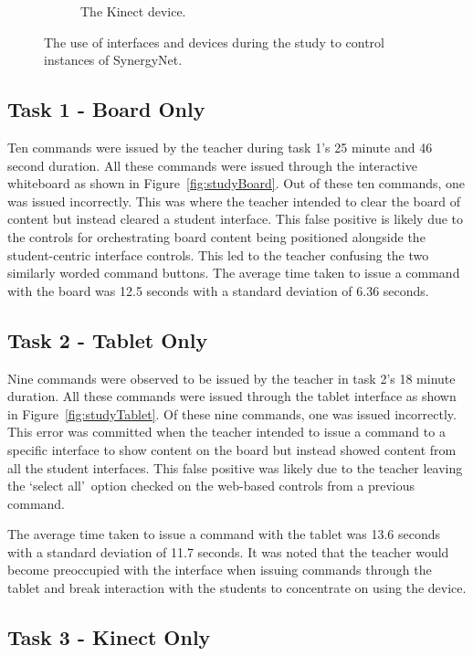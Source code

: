 \documentclass[manuscript, review, screen]{acmart}
\begin{document}
\begin{figure}[t]
\begin{subfigure}[t]{0.3\textwidth}
		\caption{The Kinect device.}
		\label{fig:studyKinect}
	\end{subfigure}
   	\caption{The use of interfaces and devices during the study to control instances of SynergyNet.}
   	\label{fig:studyDevices}
\end{figure} 

\subsection{Task 1 - Board Only}
\label{sec:results:task1}  

Ten commands were issued by the teacher during task 1's 25 minute and 46 second duration.
All these commands were issued through the interactive whiteboard as shown in Figure~\ref{fig:studyBoard}.
Out of these ten commands, one was issued incorrectly.
This was where the teacher intended to clear the board of content but instead cleared a student interface.
This false positive is likely due to the controls for orchestrating board content being positioned alongside the student-centric interface controls.
This led to the teacher confusing the two similarly worded command buttons.
The average time taken to issue a command with the board was 12.5 seconds with a standard deviation of 6.36 seconds.

\subsection{Task 2 - Tablet Only}
\label{sec:results:task2}  

Nine commands were observed to be issued by the teacher in task 2's 18 minute duration.
All these commands were issued through the tablet interface as shown in Figure~\ref{fig:studyTablet}.
Of these nine commands, one was issued incorrectly.
This error was committed when the teacher intended to issue a command to a specific interface to show content on the board but instead showed content from all the student interfaces.
This false positive was likely due to the teacher leaving the \lq select all\rq\ option checked on the web-based controls from a previous command.

The average time taken to issue a command with the tablet was 13.6 seconds with a standard deviation of 11.7 seconds.
It was noted that the teacher would become preoccupied with the interface when issuing commands through the tablet and break interaction with the students to concentrate on using the device.

\subsection{Task 3 - Kinect Only}
\label{sec:results:task3}  
\end{document}
